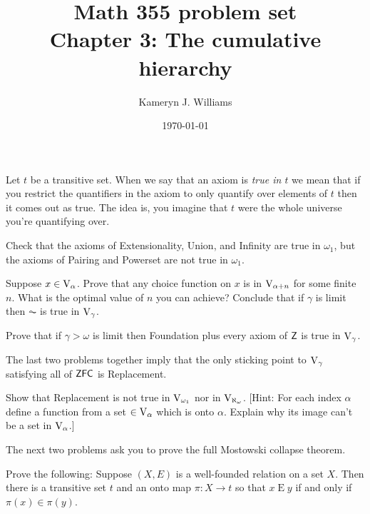 \documentclass[10pt]{amsart}
\title{Math 355 problem set \\ Chapter 3: The cumulative hierarchy}
\author{Kameryn J. Williams}
\date{\today}
\begin{document}
\maketitle



Let $t$ be a transitive set. When we say that an axiom is \emph{true in $t$} we mean that if you restrict the quantifiers in the axiom to only quantify over elements of $t$ then it comes out as true. The idea is, you imagine that $t$ were the whole universe you're quantifying over.

\begin{problem}
Check that the axioms of Extensionality, Union, and Infinity are true in $\omega_1$, but the axioms of Pairing and Powerset are not true in $\omega_1$.
\end{problem}

\begin{problem}
Suppose $x \in \mathrm{V}_\alpha$. Prove that any choice function on $x$ is in $\mathrm{V}_{\alpha+n}$ for some finite $n$. What is the optimal value of $n$ you can achieve? Conclude that if $\gamma$ is limit then $\AC$ is true in $\mathrm{V}_\gamma$.
\end{problem}

\begin{problem}
Prove that if $\gamma > \omega$ is limit then Foundation plus every axiom of $\mathsf{Z}$ is true in $\mathrm{V}_\gamma$. 
\end{problem}

The last two problems together imply that the only sticking point to $\mathrm{V}_\gamma$ satisfying all of $\mathsf{ZFC}$ is Replacement.

\begin{problem}
Show that Replacement is not true in $\mathrm{V}_{\omega_1}$ nor in $\mathrm{V}_{\aleph_\omega}$. [Hint: For each index $\alpha$ define a function from a set $\in \mathrm{V}_{\alpha}$ which is onto $\alpha$. Explain why its image can't be a set in $\mathrm{V}_\alpha$.]
\end{problem}

The next two problems ask you to prove the full Mostowski collapse theorem.

\begin{problem}
Prove the following: Suppose $(X,E)$ is a well-founded relation on a set $X$. Then there is a transitive set $t$ and an onto map $\pi : X \to t$ so that $x \mathbin E y$ if and only if $\pi(x) \in \pi(y)$.
\end{problem}
\end{document}
